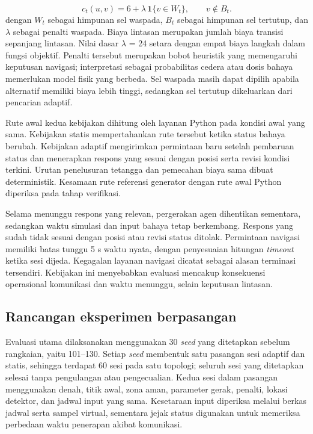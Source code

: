 \documentclass[10pt,a4paper]{article}
\begin{document}
\begin{equation}
 c_t(u,v)=6+\lambda\,\mathbf{1}\{v\in W_t\},\qquad v\notin B_t.
 \label{eq:cost}
\end{equation}
dengan $W_t$ sebagai himpunan sel waspada, $B_t$ sebagai himpunan sel tertutup, dan $\lambda$ sebagai penalti waspada. Biaya lintasan merupakan jumlah biaya transisi sepanjang lintasan. Nilai dasar $\lambda$ = 24 setara dengan empat biaya langkah dalam fungsi objektif. Penalti tersebut merupakan bobot heuristik yang memengaruhi keputusan navigasi; interpretasi sebagai probabilitas cedera atau dosis bahaya memerlukan model fisik yang berbeda. Sel waspada masih dapat dipilih apabila alternatif memiliki biaya lebih tinggi, sedangkan sel tertutup dikeluarkan dari pencarian adaptif.

Rute awal kedua kebijakan dihitung oleh layanan Python pada kondisi awal yang sama. Kebijakan statis mempertahankan rute tersebut ketika status bahaya berubah. Kebijakan adaptif mengirimkan permintaan baru setelah pembaruan status dan menerapkan respons yang sesuai dengan posisi serta revisi kondisi terkini. Urutan penelusuran tetangga dan pemecahan biaya sama dibuat deterministik. Kesamaan rute referensi generator dengan rute awal Python diperiksa pada tahap verifikasi.

Selama menunggu respons yang relevan, pergerakan agen dihentikan sementara, sedangkan waktu simulasi dan input bahaya tetap berkembang. Respons yang sudah tidak sesuai dengan posisi atau revisi status ditolak. Permintaan navigasi memiliki batas tunggu 5 s waktu nyata, dengan penyesuaian hitungan \emph{timeout} ketika sesi dijeda. Kegagalan layanan navigasi dicatat sebagai alasan terminasi tersendiri. Kebijakan ini menyebabkan evaluasi mencakup konsekuensi operasional komunikasi dan waktu menunggu, selain keputusan lintasan.

\subsection*{Rancangan eksperimen berpasangan}
Evaluasi utama dilaksanakan menggunakan 30 \emph{seed} yang ditetapkan sebelum rangkaian, yaitu 101--130. Setiap \emph{seed} membentuk satu pasangan sesi adaptif dan statis, sehingga terdapat 60 sesi pada satu topologi; seluruh sesi yang ditetapkan selesai tanpa pengulangan atau pengecualian. Kedua sesi dalam pasangan menggunakan denah, titik awal, zona aman, parameter gerak, penalti, lokasi detektor, dan jadwal input yang sama. Kesetaraan input diperiksa melalui berkas jadwal serta sampel virtual, sementara jejak status digunakan untuk memeriksa perbedaan waktu penerapan akibat komunikasi.
\end{document}
